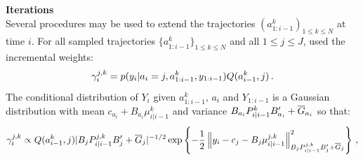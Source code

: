 \noindent\textbf{Iterations}\\
Several procedures may be used to extend the trajectories $(a^k_{1:i-1})_{1\le k \le N}$ at time $i$.
For all sampled trajectories $\{a_{1:i-1}^k\}_{1\le k \le N}$ and all $1\le j \le J$,  \cite{chen:liu:2000} used the incremental weights:
\[
\gamma_i^{j,k} = p(y_i | a_i = j, a_{1:i-1}^k, y_{1:i-1}) Q(a_{i-1}^k,j)\eqsp.
\]
The conditional distribution of $Y_i$ given $a^k_{1:i-1}$, $a_i$ and $Y_{1:i-1}$ is a Gaussian distribution with mean $c_{a_i}+B_{a_i}\mu^k_{i|i-1}$ and variance $B_{a_i}P^k_{i|i-1}B'_{a_i} + \barG_{a_i}$ so that:%
\[
\gamma_i^{j,k} \propto  Q(a_{i-1}^k,j)|B_jP^{j,k}_{i|i-1}B'_j + \barG_j|^{-1/2}\exp\left\{-\frac{1}{2}\normMat{B_jP^{j,k}_{i|i-1}B'_j + \barG_j}{y_i-c_{j}-B_j\mu^{j,k}_{i|i-1}}^2\right\} \eqsp,
\]
